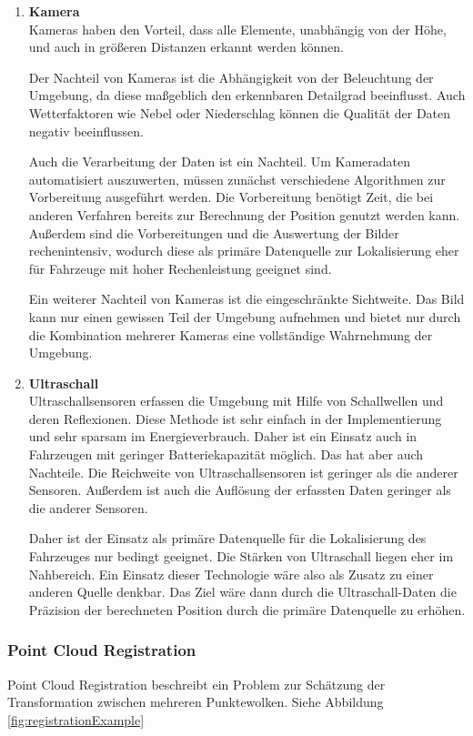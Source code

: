\begin{enumerate}[leftmargin=*]
    \item \textbf{Kamera} \\
    Kameras haben den Vorteil, dass alle Elemente, unabhängig von der Höhe, und auch in größeren Distanzen erkannt werden können. 

    Der Nachteil von Kameras ist die Abhängigkeit von der Beleuchtung der Umgebung, da diese maßgeblich den erkennbaren Detailgrad beeinflusst.
    Auch Wetterfaktoren wie Nebel oder Niederschlag können die Qualität der Daten negativ beeinflussen.

    Auch die Verarbeitung der Daten ist ein Nachteil. 
    Um Kameradaten automatisiert auszuwerten, müssen zunächst verschiedene Algorithmen zur Vorbereitung ausgeführt werden. 
    Die Vorbereitung benötigt Zeit, die bei anderen Verfahren bereits zur Berechnung der Position genutzt werden kann.
    Außerdem sind die Vorbereitungen und die Auswertung der Bilder rechenintensiv, 
    wodurch diese als primäre Datenquelle zur Lokalisierung eher für Fahrzeuge mit hoher Rechenleistung geeignet sind.

    Ein weiterer Nachteil von Kameras ist die eingeschränkte Sichtweite. 
    Das Bild kann nur einen gewissen Teil der Umgebung aufnehmen und bietet nur durch die Kombination mehrerer Kameras eine vollständige Wahrnehmung der Umgebung.

    \item \textbf{Ultraschall} \\
    Ultraschallsensoren erfassen die Umgebung mit Hilfe von Schallwellen und deren Reflexionen. 
    Diese Methode ist sehr einfach in der Implementierung und sehr sparsam im Energieverbrauch. 
    Daher ist ein Einsatz auch in Fahrzeugen mit geringer Batteriekapazität möglich.
    Das hat aber auch Nachteile. 
    Die Reichweite von Ultraschallsensoren ist geringer als die anderer Sensoren. 
    Außerdem ist auch die Auflösung der erfassten Daten geringer als die anderer Sensoren.

    Daher ist der Einsatz als primäre Datenquelle für die Lokalisierung des Fahrzeuges nur bedingt geeignet.
    Die Stärken von Ultraschall liegen eher im Nahbereich.
    Ein Einsatz dieser Technologie wäre also als Zusatz zu einer anderen Quelle denkbar. 
    Das Ziel wäre dann durch die Ultraschall-Daten die Präzision der berechneten Position durch die primäre Datenquelle zu erhöhen. 
\end{enumerate}

\subsubsection{Point Cloud Registration}
\label{pcl}
Point Cloud Registration beschreibt ein Problem zur Schätzung der Transformation zwischen mehreren Punktewolken. Siehe Abbildung \ref{fig:registrationExample}

